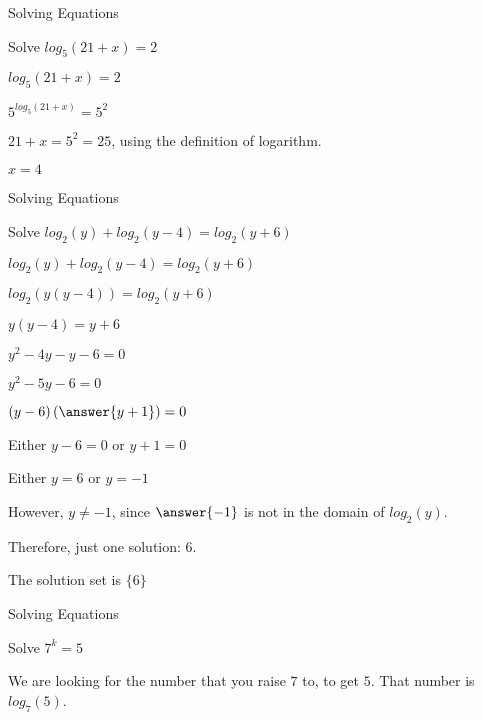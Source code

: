 \documentclass{ximera}
\begin{document}
\begin{example} Solving Equations


Solve $log_5(21 + x) = 2$


\begin{explanation}


$log_5(21 + x) = 2$

$5^{log_5(21 + x)} = 5^2$

$21 + x = 5^2 = 25$, using the definition of logarithm.

$x = 4$
\end{explanation}
\end{example}










\begin{example} Solving Equations


Solve $log_2(y) + log_2(y-4) = log_2(y+6)$

\begin{explanation}


$log_2(y) + log_2(y-4) = log_2(y+6)$

$log_2(y(y-4)) = log_2(y+6)$

$y(y-4) = y+6$    

$y^2 - 4y - y - 6 = 0$

$y^2 - 5y - 6 = 0$

$(y-6) \left( \answer{y+1} \right) = 0$


Either $y-6 = 0$ or $y+1 = 0$

Either $y = 6$ or $y = -1$

However, $y \ne -1$, since $\answer{-1}$ is not in the domain of $log_2(y)$.

Therefore, just one solution: $6$.

The solution set is $\{ 6 \}$
\end{explanation}
\end{example}






\begin{example} Solving Equations


Solve $7^k = 5$


\begin{explanation}


We are looking for the number that you raise $7$ to, to get $5$.  That number  is $log_7(5)$.
\end{explanation}
\end{example}
\end{document}
